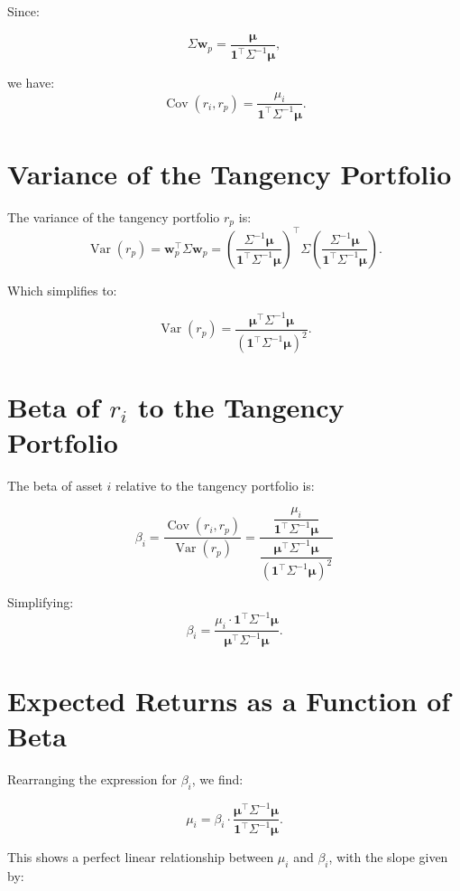 \documentclass{article}
\begin{document}
Since:

\[
\Sigma \mathbf{w}_p = \frac{\boldsymbol{\mu}}{\mathbf{1}^\top \Sigma^{-1} \boldsymbol{\mu}},
\]

we have:
\[
\operatorname{Cov}(r_i, r_p) = \frac{\mu_i}{\mathbf{1}^\top \Sigma^{-1} \boldsymbol{\mu}}.
\]

\section{Variance of the Tangency Portfolio}

The variance of the tangency portfolio \( r_p \) is:
\[
\operatorname{Var}(r_p) = \mathbf{w}_p^\top \Sigma \mathbf{w}_p = \left( \frac{\Sigma^{-1} \boldsymbol{\mu}}{\mathbf{1}^\top \Sigma^{-1} \boldsymbol{\mu}} \right)^\top \Sigma \left( \frac{\Sigma^{-1} \boldsymbol{\mu}}{\mathbf{1}^\top \Sigma^{-1} \boldsymbol{\mu}} \right).
\]

Which simplifies to:

\[
\operatorname{Var}(r_p) = \frac{\boldsymbol{\mu}^\top \Sigma^{-1} \boldsymbol{\mu}}{\left( \mathbf{1}^\top \Sigma^{-1} \boldsymbol{\mu} \right)^2}.
\]

\section{Beta of $r_i$ to the Tangency Portfolio}
The beta of asset \( i \) relative to the tangency portfolio is:

\[
\beta_i
= \frac{\operatorname{Cov}(r_i, r_p)}{\operatorname{Var}(r_p)}
= \dfrac{ \dfrac{\mu_i}{\mathbf{1}^\top \Sigma^{-1} \boldsymbol{\mu}} }{ \dfrac{\boldsymbol{\mu}^\top \Sigma^{-1} \boldsymbol{\mu}}{\left( \mathbf{1}^\top \Sigma^{-1} \boldsymbol{\mu} \right)^2} }
\]

Simplifying:
\[
\beta_i = \frac{\mu_i \cdot \mathbf{1}^\top \Sigma^{-1} \boldsymbol{\mu}}{\boldsymbol{\mu}^\top \Sigma^{-1} \boldsymbol{\mu}}.
\]

\section{Expected Returns as a Function of Beta}

Rearranging the expression for \( \beta_i \), we find:

\[
\mu_i = \beta_i \cdot \frac{\boldsymbol{\mu}^\top \Sigma^{-1} \boldsymbol{\mu}}{\mathbf{1}^\top \Sigma^{-1} \boldsymbol{\mu}}.
\]

This shows a perfect linear relationship between \( \mu_i \) and \( \beta_i \), with the slope given by:
\end{document}
